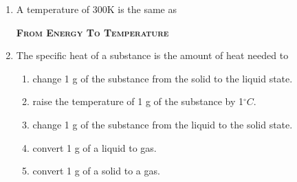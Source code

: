 \documentclass[main.tex]{subfiles}
\begin{document}
\begin{multicols*}{2}
\begin{enumerate}
\begin{enumerate}[label=(\alph*)]
\end{enumerate}
\item A temperature of 300K is the same as   
\begin{enumerate}[label=(\alph*)]
\end{enumerate}



{\raggedright\textsc{\textbf{From Energy To Temperature }}\par}

\item The specific heat of a substance is the amount of heat needed to
\begin{enumerate}[label=(\alph*)]
\item change 1 g of the substance from the solid to the liquid state.
\item raise the temperature of 1 g of the substance by 1$^{\circ}C$.
\item change 1 g of the substance from the liquid to the solid state.
\item convert 1 g of a liquid to gas.
\item convert 1 g of a solid to a gas.
\end{enumerate}


\end{enumerate}
\end{multicols*}
\end{document}
